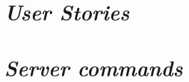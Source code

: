 \begin{appendix}

\chapter{\textit{User Stories}}

\chapter{\textit{Server commands}}

\end{appendix}